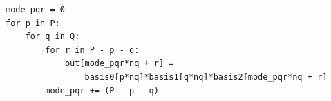 \begin{lstlisting}
mode_pqr = 0
for p in P:
    for q in Q:
        for r in P - p - q:
            out[mode_pqr*nq + r] = 
                basis0[p*nq]*basis1[q*nq]*basis2[mode_pqr*nq + r]
        mode_pqr += (P - p - q)
\end{lstlisting}


%
%
%
%
%
%
